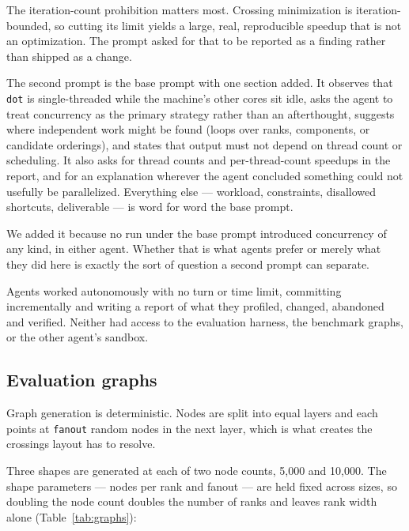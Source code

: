 The iteration-count prohibition matters most. Crossing minimization is
iteration-bounded, so cutting its limit yields a large, real, reproducible
speedup that is not an optimization. The prompt asked for that to be reported as
a finding rather than shipped as a change.

The second prompt is the base prompt with one section added. It observes that
\texttt{dot} is single-threaded while the machine's other cores sit idle, asks
the agent to treat concurrency as the primary strategy rather than an
afterthought, suggests where independent work might be found (loops over ranks,
components, or candidate orderings), and states that output must not depend on
thread count or scheduling. It also asks for thread counts and per-thread-count
speedups in the report, and for an explanation wherever the agent concluded
something could not usefully be parallelized. Everything else --- workload,
constraints, disallowed shortcuts, deliverable --- is word for word the base
prompt.

We added it because no run under the base prompt introduced concurrency of any
kind, in either agent. Whether that is what agents prefer or merely what they
did here is exactly the sort of question a second prompt can separate.

Agents worked autonomously with no turn or time limit, committing incrementally
and writing a report of what they profiled, changed, abandoned and verified.
Neither had access to the evaluation harness, the benchmark graphs, or the other
agent's sandbox.

\subsection{Evaluation graphs}
\label{sec:graphs}

Graph generation is deterministic. Nodes are split into equal layers and each
points at \texttt{fanout} random nodes in the next layer, which is what creates
the crossings layout has to resolve.

Three shapes are generated at each of two node counts, 5{,}000 and 10{,}000. The
shape parameters --- nodes per rank and fanout --- are held fixed across sizes,
so doubling the node count doubles the number of ranks and leaves rank width
alone (Table~\ref{tab:graphs}):

